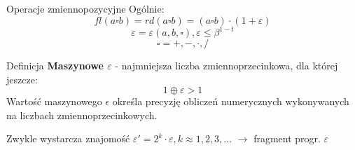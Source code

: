 \begin{frame}{Operacje zmiennopozycyjne}
    Ogólnie:
    \[
    fl(a \square b) = rd(a \square b) = (a \square b) \cdot (1 + \varepsilon)
    \] \[
    \varepsilon = \varepsilon(a, b, \square), \varepsilon \le \beta^{1-t}
    \] \[
    \square = +, -, \cdot, /
    \]

    \begin{block}{Definicja}
        {\bf Maszynowe $\varepsilon$} - najmniejsza liczba zmiennoprzecinkowa, dla której jeszcze: \[
        1 \oplus \varepsilon > 1
        \]
        Wartość maszynowego $\epsilon$ określa precyzję obliczeń numerycznych wykonywanych na liczbach zmiennoprzecinkowych.
    \end{block}

    Zwykle wystarcza znajomość $\varepsilon' = 2^k \cdot \varepsilon, k \approx 1, 2, 3, ...$ $\rightarrow$ fragment progr. $\varepsilon$
\end{frame}
